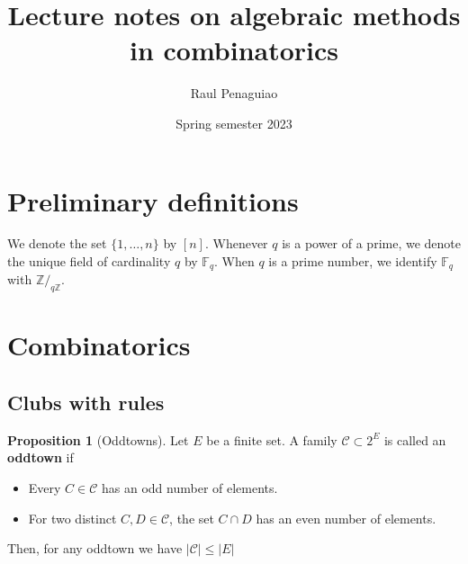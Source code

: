 \documentclass[12pt]{amsart}
\theoremstyle{definition}
\newtheorem{prop}[thm]{Proposition}
\newcommand{\Z}{\mathbb{Z}}
\newcommand{\F}{\mathbb{F}}
\newcommand{\CC}{\mathcal C}
\begin{document}
\title{Lecture notes on algebraic methods in combinatorics} %

\author{Raul Penaguiao}
\address{Max Planck Institute for the Sciences Leipzig}
\subjclass[2010]{}
\date{Spring semester 2023} %


\maketitle


\section{Preliminary definitions}

We denote the set $\{1, \dots, n\}$ by $[n]$.
Whenever $q$ is a power of a prime, we denote the unique field of cardinality $q$ by $\F_q$.
When $q$ is a prime number, we identify $\F_q$ with $\Z/_{q\Z}$.

\section{Combinatorics}

\subsection{Clubs with rules}


\begin{prop}[Oddtowns]
Let $E$ be a finite set.
A family $\CC \subset 2^E $ is called an \textbf{oddtown} if
\begin{itemize}
\item Every $C \in \CC $ has an odd number of elements.

\item For two distinct $C, D \in \CC$, the set $C\cap D$ has an even number of elements.
\end{itemize}

Then, for any oddtown we have $|\CC| \leq |E|$
\end{prop}
\end{document}
